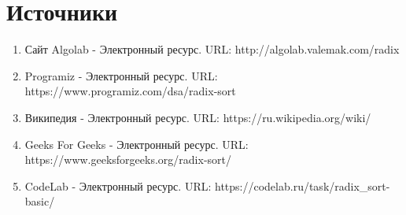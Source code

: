 \documentclass{report}
\begin{document}
\section*{Источники}
\begin{enumerate}
\item Сайт Algolab - Электронный ресурс. URL: http://algolab.valemak.com/radix
\item Programiz - Электронный ресурс. URL: https://www.programiz.com/dsa/radix-sort
\item Википедия - Электронный ресурс. URL: https://ru.wikipedia.org/wiki/%
\item Geeks For Geeks - Электронный ресурс. URL: https://www.geeksforgeeks.org/radix-sort/
\item CodeLab - Электронный ресурс. URL: https://codelab.ru/task/radix\_sort-basic/
\end{enumerate} 
\newpage
\end{document}
